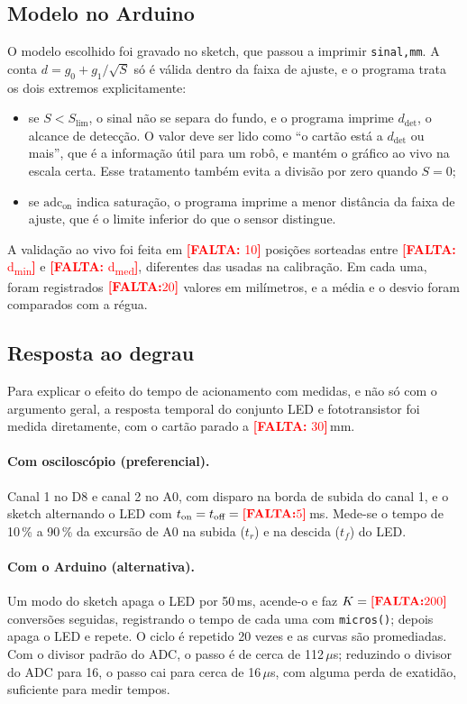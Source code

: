 \documentclass[11pt,a4paper]{article}
\newcommand{\pendente}[1]{\textcolor{red}{\textbf{[FALTA:} #1\textbf{]}}}
\begin{document}
\subsection{Modelo no Arduino}
\label{sec:met-arduino}

O modelo escolhido foi gravado no sketch, que passou a imprimir \texttt{sinal,mm}. A conta $d = g_0 + g_1/\sqrt{S}$ só é válida dentro da faixa de ajuste, e o programa trata os dois extremos explicitamente:
\begin{itemize}[nosep]
  \item se $S < S_\text{lim}$, o sinal não se separa do fundo, e o programa imprime $d_\text{det}$, o alcance de detecção. O valor deve ser lido como ``o cartão está a $d_\text{det}$ ou mais'', que é a informação útil para um robô, e mantém o gráfico ao vivo na escala certa. Esse tratamento também evita a divisão por zero quando $S = 0$;
  \item se $\text{adc}_\text{on}$ indica saturação, o programa imprime a menor distância da faixa de ajuste, que é o limite inferior do que o sensor distingue.
\end{itemize}

A validação ao vivo foi feita em \pendente{10} posições sorteadas entre \pendente{d\textsubscript{min}} e \pendente{d\textsubscript{med}}, diferentes das usadas na calibração. Em cada uma, foram registrados $\pendente{20}$ valores em milímetros, e a média e o desvio foram comparados com a régua.

\subsection{Resposta ao degrau}
\label{sec:met-degrau}

Para explicar o efeito do tempo de acionamento com medidas, e não só com o argumento geral, a resposta temporal do conjunto LED e fototransistor foi medida diretamente, com o cartão parado a \pendente{30}\,mm.

\paragraph{Com osciloscópio (preferencial).} Canal 1 no D8 e canal 2 no A0, com disparo na borda de subida do canal 1, e o sketch alternando o LED com $t_\text{on} = t_\text{off} = \pendente{5}$\,ms. Mede-se o tempo de 10\,\% a 90\,\% da excursão de A0 na subida ($t_r$) e na descida ($t_f$) do LED.

\paragraph{Com o Arduino (alternativa).} Um modo do sketch apaga o LED por 50\,ms, acende-o e faz $K = \pendente{200}$ conversões seguidas, registrando o tempo de cada uma com \texttt{micros()}; depois apaga o LED e repete. O ciclo é repetido 20 vezes e as curvas são promediadas. Com o divisor padrão do ADC, o passo é de cerca de 112\,$\mu$s; reduzindo o divisor do ADC para 16, o passo cai para cerca de 16\,$\mu$s, com alguma perda de exatidão, suficiente para medir tempos.
\end{document}
